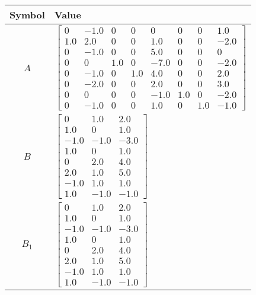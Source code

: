 \begin{tabular}{cl}
\hline
  Symbol  & Value                                                                                                                                                                                                                                                                                                                                                        \\
\hline
   $A$    & $\left[\begin{matrix}0 & -1.0 & 0 & 0 & 0 & 0 & 0 & 1.0\\1.0 & 2.0 & 0 & 0 & 1.0 & 0 & 0 & -2.0\\0 & -1.0 & 0 & 0 & 5.0 & 0 & 0 & 0\\0 & 0 & 1.0 & 0 & -7.0 & 0 & 0 & -2.0\\0 & -1.0 & 0 & 1.0 & 4.0 & 0 & 0 & 2.0\\0 & -2.0 & 0 & 0 & 2.0 & 0 & 0 & 3.0\\0 & 0 & 0 & 0 & -1.0 & 1.0 & 0 & -2.0\\0 & -1.0 & 0 & 0 & 1.0 & 0 & 1.0 & -1.0\end{matrix}\right]$ \\
   $B$    & $\left[\begin{matrix}0 & 1.0 & 2.0\\1.0 & 0 & 1.0\\-1.0 & -1.0 & -3.0\\1.0 & 0 & 1.0\\0 & 2.0 & 4.0\\2.0 & 1.0 & 5.0\\-1.0 & 1.0 & 1.0\\1.0 & -1.0 & -1.0\end{matrix}\right]$                                                                                                                                                                                \\
 $B_{1}$  & $\left[\begin{matrix}0 & 1.0 & 2.0\\1.0 & 0 & 1.0\\-1.0 & -1.0 & -3.0\\1.0 & 0 & 1.0\\0 & 2.0 & 4.0\\2.0 & 1.0 & 5.0\\-1.0 & 1.0 & 1.0\\1.0 & -1.0 & -1.0\end{matrix}\right]$                                                                                                                                                                                \\

\end{tabular}
